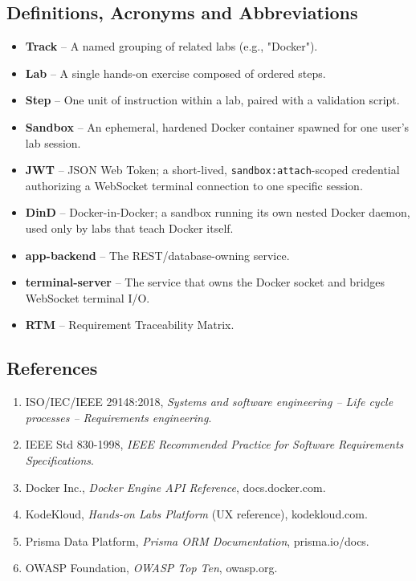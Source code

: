 \documentclass[11pt]{article}
\begin{document}
\subsection{Definitions, Acronyms and Abbreviations}
\begin{itemize}
\item \textbf{Track} -- A named grouping of related labs (e.g., "Docker").
\item \textbf{Lab} -- A single hands-on exercise composed of ordered steps.
\item \textbf{Step} -- One unit of instruction within a lab, paired with
      a validation script.
\item \textbf{Sandbox} -- An ephemeral, hardened Docker container spawned
      for one user's lab session.
\item \textbf{JWT} -- JSON Web Token; a short-lived,
      \texttt{sandbox:attach}-scoped credential authorizing a WebSocket
      terminal connection to one specific session.
\item \textbf{DinD} -- Docker-in-Docker; a sandbox running its own
      nested Docker daemon, used only by labs that teach Docker itself.
\item \textbf{app-backend} -- The REST/database-owning service.
\item \textbf{terminal-server} -- The service that owns the Docker
      socket and bridges WebSocket terminal I/O.
\item \textbf{RTM} -- Requirement Traceability Matrix.
\end{itemize}

\subsection{References}
\begin{enumerate}
\item ISO/IEC/IEEE 29148:2018, \emph{Systems and software engineering
      -- Life cycle processes -- Requirements engineering}.
\item IEEE Std 830-1998, \emph{IEEE Recommended Practice for Software
      Requirements Specifications}.
\item Docker Inc., \emph{Docker Engine API Reference}, docs.docker.com.
\item KodeKloud, \emph{Hands-on Labs Platform} (UX reference),
      kodekloud.com.
\item Prisma Data Platform, \emph{Prisma ORM Documentation},
      prisma.io/docs.
\item OWASP Foundation, \emph{OWASP Top Ten}, owasp.org.
\end{enumerate}
\end{document}
